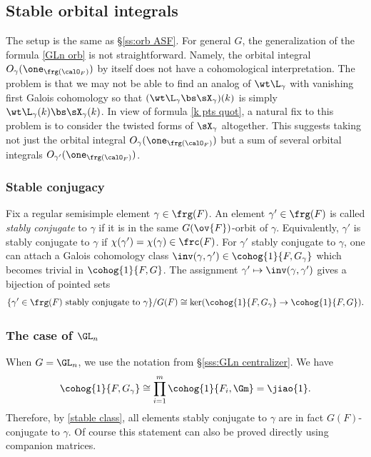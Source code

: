 \subsection{Stable orbital integrals} The setup is the same as \S\ref{ss:orb ASF}. For general $G$, the generalization of the formula \eqref{GLn orb} is not straightforward. Namely, the orbital integral $O_{\gamma}(\one_{\frg(\calO_{F})})$ by itself does not have a cohomological interpretation. The problem is that we may not be able to find an analog of $\wt\L_{\gamma}$ with vanishing first Galois cohomology so that $(\wt\L_{\gamma}\bs\sX_{\gamma})(k)$ is simply $\wt\L_{\gamma}(k)\bs \sX_{\gamma}(k)$. In view of formula \eqref{k pts quot},  a natural fix to this problem is to consider the twisted forms of $\sX_{\gamma}$ altogether. This suggests taking not just the orbital integral $O_{\gamma}(\one_{\frg(\calO_{F})})$ but a sum of several orbital integrals $O_{\gamma'}(\one_{\frg(\calO_{F})})$.


\subsubsection{Stable conjugacy} Fix a regular semisimple element $\gamma\in\frg(F)$. An element $\gamma'\in\frg(F)$ is called {\em stably conjugate} to $\gamma$ if it is in the same $G(\ov{F})$-orbit of $\gamma$. Equivalently, $\gamma'$ is stably conjugate to $\gamma$ if $\chi(\gamma')=\chi(\gamma)\in\frc(F)$. For $\gamma'$ stably conjugate to $\gamma$, one can attach a Galois cohomology class $\inv(\gamma,\gamma')\in\cohog{1}{F,G_{\gamma}}$ which becomes trivial in $\cohog{1}{F,G}$. The assignment $\gamma'\mapsto\inv(\gamma,\gamma')$ gives a bijection of pointed sets
\begin{equation}\label{stable class}
\{\gamma'\in\frg(F) \mbox{ stably conjugate to } \gamma\}/G(F) \cong \ker(\cohog{1}{F,G_{\gamma}}\to \cohog{1}{F,G}).
\end{equation}

\subsubsection{The case of $\GL_{n}$} When $G=\GL_{n}$, we use the notation from \S\ref{sss:GLn centralizer}. We have
\begin{equation*}
\cohog{1}{F,G_{\gamma}}\cong \prod_{i=1}^{m}\cohog{1}{F_{i},\Gm}=\jiao{1}.
\end{equation*}
Therefore, by \eqref{stable class}, all elements stably conjugate to $\gamma$ are in fact $G(F)$-conjugate to $\gamma$. Of course this statement can also be proved directly using companion matrices. 

